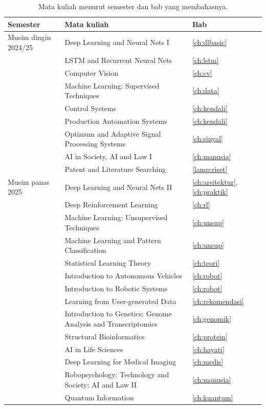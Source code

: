 \begin{table}[ht]
\centering\small
\caption{Mata kuliah menurut semester dan bab yang membahasnya.}
\label{tab:perjalanan}
\begin{tabularx}{\linewidth}{@{}p{3.6cm}Xp{1.4cm}@{}}
\toprule
Semester & Mata kuliah & Bab \\
\midrule
Musim dingin 2024/25
 & Deep Learning and Neural Nets I & \ref{ch:dlbasic} \\
 & LSTM and Recurrent Neural Nets & \ref{ch:lstm} \\
 & Computer Vision & \ref{ch:cv} \\
 & Machine Learning: Supervised Techniques & \ref{ch:data} \\
 & Control Systems & \ref{ch:kendali} \\
 & Production Automation Systems & \ref{ch:kendali} \\
 & Optimum and Adaptive Signal Processing Systems & \ref{ch:sinyal} \\
 & AI in Society, AI and Law I & \ref{ch:manusia} \\
 & Patent and Literature Searching & \ref{lamp:riset} \\
\midrule
Musim panas 2025
 & Deep Learning and Neural Nets II & \ref{ch:arsitektur}, \ref{ch:praktik} \\
 & Deep Reinforcement Learning & \ref{ch:rl} \\
 & Machine Learning: Unsupervised Techniques & \ref{ch:unsup} \\
 & Machine Learning and Pattern Classification & \ref{ch:unsup} \\
 & Statistical Learning Theory & \ref{ch:teori} \\
 & Introduction to Autonomous Vehicles & \ref{ch:robot} \\
 & Introduction to Robotic Systems & \ref{ch:robot} \\
 & Learning from User-generated Data & \ref{ch:rekomendasi} \\
 & Introduction to Genetics; Genome Analysis and Transcriptomics & \ref{ch:genomik} \\
 & Structural Bioinformatics & \ref{ch:protein} \\
 & AI in Life Sciences & \ref{ch:hayati} \\
 & Deep Learning for Medical Imaging & \ref{ch:medis} \\
 & Robopsychology; Technology and Society; AI and Law II & \ref{ch:manusia} \\
 & Quantum Information & \ref{ch:kuantum} \\

\end{tabularx}
\end{table}
